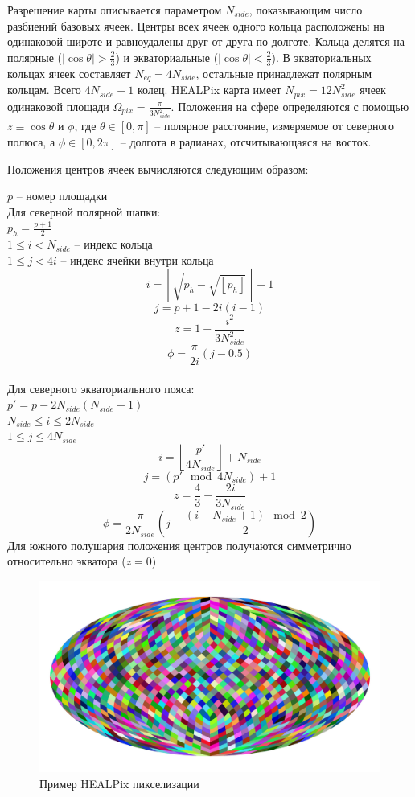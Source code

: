 \documentclass[14pt]{article} %
\begin{document}
Разрешение карты описывается параметром $N_{side}$, показывающим число разбиений базовых ячеек. Центры всех ячеек одного кольца расположены на одинаковой широте и равноудалены друг от друга по долготе. Кольца делятся на полярные ($\left|\cos\theta\right|>\frac{2}{3}$) и экваториальные ($\left|\cos\theta\right|<\frac{2}{3}$). В экваториальных кольцах ячеек составляет $N_{eq}=4N_{side}$, остальные принадлежат полярным кольцам. Всего $4N_{side}-1$ колец.
HEALPix карта имеет $N_{pix}=12N_{side}^2$ ячеек одинаковой площади $\Omega_{pix}=\frac{\pi}{3N_{side}^2}$.
Положения на сфере определяются с помощью $z \equiv \cos\theta$ и $\phi$, где $\theta \in \left[0,\pi\right]$ -- полярное расстояние, измеряемое от северного полюса, а $\phi \in\left[0,2\pi\right]$ -- долгота в радианах, отсчитывающаяся на восток.

Положения центров ячеек вычисляются следующим образом:

$p$ -- номер площадки\\
Для северной полярной шапки:\\
$p_h=\frac{p+1}{2}$\\
$1\le i<N_{side}$ -- индекс кольца\\
$1\le j<4i$ -- индекс ячейки внутри кольца\\
$$i=\left\lfloor\sqrt{p_h-\sqrt{\left\lfloor p_h\right\rfloor}}\right\rfloor+1$$
$$j=p+1-2i\left(i-1\right)$$
$$z=1-\frac{i^2}{3N_{side}^2}$$
$$\phi=\frac{\pi}{2i}\left(j-0.5\right)$$\\
Для северного экваториального пояса:\\
$p'=p-2N_{side}\left(N_{side}-1\right)$\\
$N_{side}\le i\le 2N_{side}$\\
$1\le j\le 4N_{side}$
$$i=\left\lfloor\frac{p'}{4N_{side}}\right\rfloor + N_{side}$$
$$j=(p' \mod 4N_{side}) +1$$
$$z=\frac{4}{3}-\frac{2i}{3N_{side}}$$
$$\phi=\frac{\pi}{2N_{side}}\left(j-\frac{\left(i-N_{side}+1\right)\mod 2}{2}\right)$$
Для южного полушария положения центров получаются симметрично относительно экватора ($z=0$) 
\begin{figure}[h!]
\includegraphics[width=1\linewidth]{healpexample.jpg}
\caption*{Пример HEALPix пикселизации}
\end{figure}
\newpage
\end{document}
